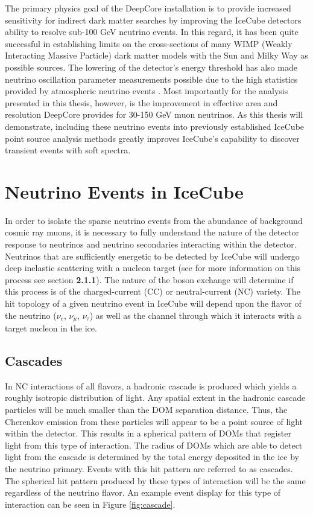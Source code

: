 \documentclass{gatech-thesis}
\begin{document}
The primary physics goal of the DeepCore installation is to provide increased sensitivity for indirect dark matter searches by improving the IceCube detectors ability to resolve sub-100 GeV neutrino events. In this regard, it has been quite successful in establishing limits on the cross-sections of many WIMP (Weakly Interacting Massive Particle) dark matter models with the Sun \cite{2013PhRvL.110m1302A} and Milky Way \cite{2011PhRvD..84b2004A} as possible sources. The lowering of the detector's energy threshold has also made neutrino oscillation parameter measurements possible due to the high statistics provided by atmospheric neutrino events \cite{2013PhRvL.111h1801A}. Most importantly for the analysis presented in this thesis, however, is the improvement in effective area and resolution DeepCore provides for 30-150 GeV muon neutrinos. As this thesis will demonstrate, including these neutrino events into previously established IceCube point source analysis methods greatly improves IceCube's capability to discover transient events with soft spectra.
\section{Neutrino Events in IceCube}

In order to isolate the sparse neutrino events from the abundance of background cosmic ray muons, it is necessary to fully understand the nature of the detector response to neutrinos and neutrino secondaries interacting within the detector. Neutrinos that are sufficiently energetic to be detected by IceCube will undergo deep inelastic scattering with a nucleon target (see for more information on this process see section \textbf{2.1.1}). The nature of the boson exchange will determine if this process is of the charged-current (CC) or neutral-current (NC) variety. The hit topology of a given neutrino event in IceCube will depend upon the flavor of the neutrino ($\nu_{e}$, $\nu_{\mu}$, $\nu_{\tau}$) as well as the channel through which it interacts with a target nucleon in the ice.
\subsection{Cascades}
In NC interactions of all flavors, a hadronic cascade is produced which yields a roughly isotropic distribution of light. Any spatial extent in the hadronic cascade particles will be much smaller than the DOM separation distance. Thus, the Cherenkov emission from these particles will appear to be a point source of light within the detector. This results in a spherical pattern of DOMs that register light from this type of interaction. The radius of DOMs which are able to detect light from the cascade is determined by the total energy deposited in the ice by the neutrino primary. Events with this hit pattern are referred to as cascades.  The spherical hit pattern produced by these types of interaction will be the same regardless of the neutrino flavor. An example event display for this type of interaction can be seen in Figure \ref{fig:cascade}.
\end{document}

